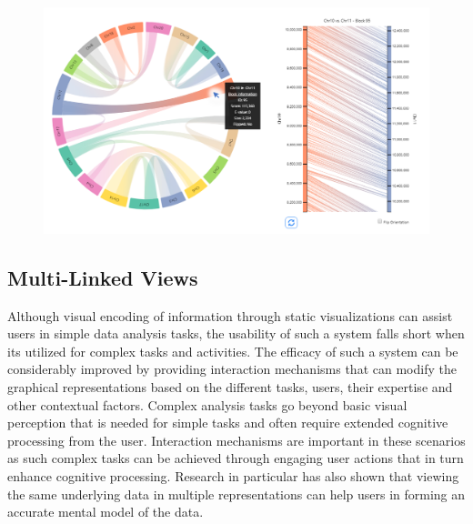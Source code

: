 \begin{figure}
  \centering
  \includegraphics[width=0.95\linewidth]{images/ch_2_accusyn.PNG}
  \label{fig:ch_2_accusyn}
\end{figure}


\subsection{Multi-Linked Views}

Although visual encoding of information through static visualizations can assist users in simple data analysis tasks, the usability of such a system falls short when its utilized for complex tasks and activities\cite{tominski2015interaction,dix1998starting,pike2009science,piringer2009multi,yi2007toward,sedig2013interaction}. The efficacy of such a system can be considerably improved by providing interaction mechanisms that can modify the graphical representations based on the different tasks, users, their expertise and other contextual factors\cite{sedig2013interaction}. Complex analysis tasks go beyond basic visual perception that is needed for simple tasks and often require extended cognitive processing from the user. Interaction mechanisms are important in these scenarios as such complex tasks can be achieved through engaging user actions that in turn enhance cognitive processing\cite{sedig2013interaction}. Research in particular has also shown that viewing the same underlying data in multiple representations can help users in forming an accurate mental model of the data\cite{larkin1987diagram,stenning1995cognitive,sedig2005designing,wang2000guidelines}.

